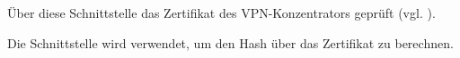 




Über diese Schnittstelle das Zertifikat des VPN-Konzentrators geprüft
(vgl. ).


Die Schnittstelle  wird
verwendet, um den Hash über das Zertifikat zu berechnen.

